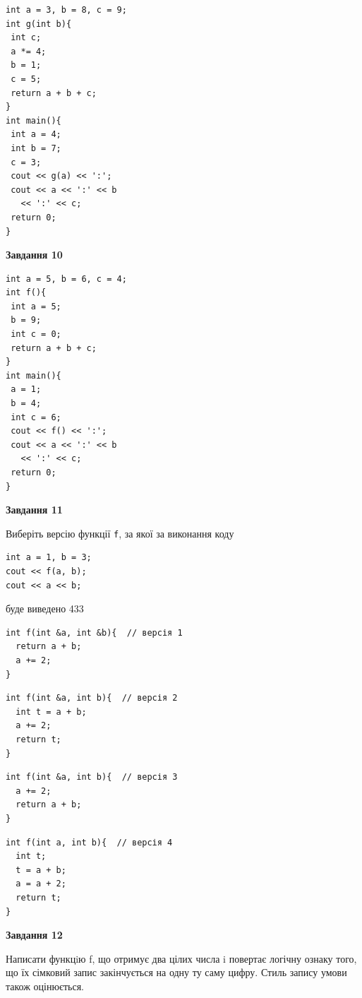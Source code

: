 \documentclass[12pt, ukrainian]{article}
\def\code#1{\Verb!#1!}
\begin{document}
{\begin {large}
\begin{minipage}[t]{7.0cm}
\begin{verbatim}
int a = 3, b = 8, c = 9;
int g(int b){
 int c;
 a *= 4;
 b = 1;
 c = 5;
 return a + b + c;
}
int main(){
 int a = 4;
 int b = 7;
 c = 3;
 cout << g(a) << ':';
 cout << a << ':' << b 
   << ':' << c;
 return 0;
}
\end{verbatim}



\begin{center}
\textbf{Завдання 10}
\end{center}
\vspace{-8mm}

\begin{verbatim}
int a = 5, b = 6, c = 4;
int f(){
 int a = 5;
 b = 9;
 int c = 0;
 return a + b + c;
}
int main(){
 a = 1;
 b = 4;
 int c = 6;
 cout << f() << ':';
 cout << a << ':' << b 
   << ':' << c;
 return 0;
}
\end{verbatim}

\end{minipage}
\vline \hspace{1mm}
\begin{minipage}[t]{11.0cm}

\begin{center}
\textbf{Завдання 11}
\end{center}
Виберіть версію функції \code{f}, за якої за виконання коду
\begin{verbatim}
int a = 1, b = 3;
cout << f(a, b);
cout << a << b;
\end{verbatim}

буде виведено 433

\begin{verbatim}
int f(int &a, int &b){  // версія 1
  return a + b;
  a += 2;
}
\end{verbatim}

\vspace{-8mm}\begin{verbatim}
int f(int &a, int b){  // версія 2
  int t = a + b;
  a += 2;
  return t;
}
\end{verbatim}

\vspace{-8mm}\begin{verbatim}
int f(int &a, int b){  // версія 3
  a += 2;
  return a + b;
}
\end{verbatim}

\vspace{-8mm}\begin{verbatim}
int f(int a, int b){  // версія 4
  int t;
  t = a + b;
  a = a + 2;
  return t;
}
\end{verbatim}



\begin{center}
\textbf{Завдання 12}
\end{center}

Написати функцiю f, що отримує два цілих числа i повертає логічну ознаку того, що їх сімковий запис закінчується на одну ту саму цифру. Стиль запису умови також оцінюється.\par

\end{minipage}

\end {large}}
\end{document}
